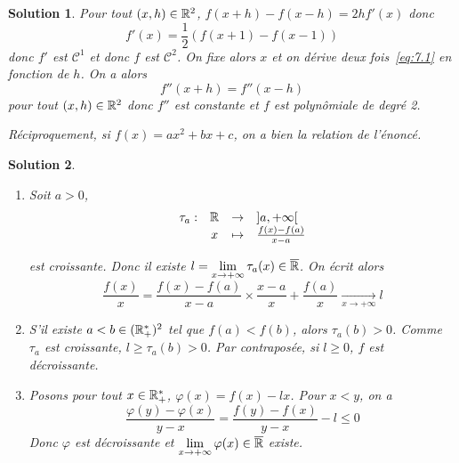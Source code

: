 \documentclass[12pt]{article}
\newtheorem{solution}{Solution}[section]
\theoremstyle{remark}
\newcommand{\function}[5]{
	$$
	\begin{array}{rccl}
		#1: & #2 & \to & #3 \\
		& #4 & \mapsto & #5
	\end{array}
	$$
}
\numberwithin{equation}{section}
\begin{document}
\begin{solution}
	Pour tout $(x,h)\in\mathbb{R}^{2}$, $f(x+h)-f(x-h)=2hf'(x)$ donc 
	\begin{equation}
		\label{eq:7.1}
		f'(x)=\frac{1}{2}(f(x+1)-f(x-1))
	\end{equation}
	donc $f'$ est $\mathcal{C}^{1}$ et donc $f$ est $\mathcal{C}^{2}$. On fixe alors $x$ et on dérive deux fois~\eqref{eq:7.1} en fonction de $h$. On a alors
	$$f''(x+h)=f''(x-h)$$
	pour tout $(x,h)\in\mathbb{R}^{2}$ donc $f''$ est constante et $f$ est polynômiale de degré 2.

	Réciproquement, si $f(x)=ax^{2}+bx+c$, on a bien la relation de l'énoncé.
\end{solution}

\begin{solution}
	\phantom{}
	\begin{enumerate}
		\item Soit $a>0$, \function{\tau_{a}}{\R}{]a,+\infty[}{x}{\frac{f(x)-f(a)}{x-a}}
		est croissante. Donc il existe $l=\lim\limits_{x\to+\infty}\tau_{a}(x)\in\overline{\mathbb{R}}$. On écrit alors 
		$$\frac{f(x)}{x}=\frac{f(x)-f(a)}{x-a}\times \frac{x-a}{x}+\frac{f(a)}{x}\xrightarrow[x\to+\infty]{}l$$

		\item S'il existe $a<b\in(\mathbb{R}_{+}^{*})^{2}$ tel que $f(a)<f(b)$, alors $\tau_{a}(b)>0$. Comme $\tau_{a}$ est croissante, $l\geqslant\tau_{a}(b)>0$. Par contraposée, si $l\geqslant0$, $f$ est décroissante.
		\item Posons pour tout $x\in\mathbb{R}_{+}^{*}$, $\varphi(x)=f(x)-lx$. Pour $x<y$, on a 
		$$\frac{\varphi(y)-\varphi(x)}{y-x}=\frac{f(y)-f(x)}{y-x}-l\leqslant0$$
		Donc $\varphi$ est décroissante et $\lim\limits_{x\to+\infty}\varphi(x)\in\overline{\mathbb{R}}$ existe.
	\end{enumerate}
\end{solution}
\end{document}
